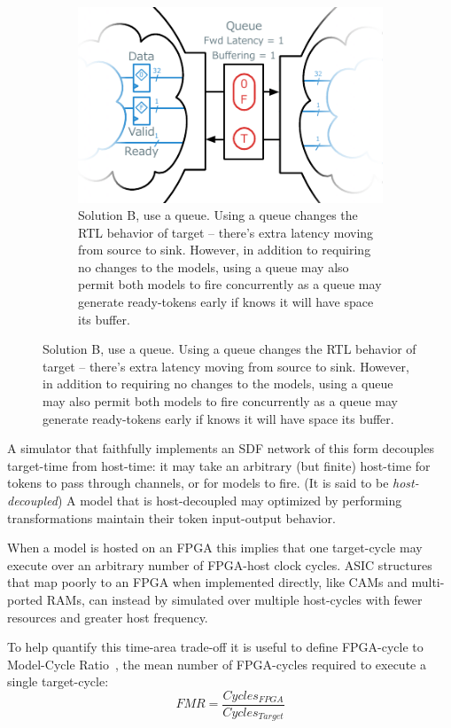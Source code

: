 \begin{figure}
\begin{subfigure}[t]{0.48\textwidth}
    \end{subfigure}\hspace{0.5cm}
    \begin{subfigure}[t]{0.48\textwidth}
        \includegraphics[width=\textwidth]{figures/queue-decoupled-example.pdf}
        \caption{Solution B, use a queue. Using a queue changes the RTL
        behavior of target -- there's extra latency moving from source to sink.
        However, in addition to requiring no changes to the models, using a queue may also
        permit both models to fire concurrently as a queue may generate
        ready-tokens early if knows it will have space its buffer.}
        \label{fig:queue-decoupled-example}
    \end{subfigure}
\end{figure}

A simulator that faithfully implements an SDF network of this form decouples
target-time from host-time: it may take an arbitrary (but finite) host-time for
tokens to pass through channels, or for models to fire. (It is said to be
\emph{host-decoupled}) A model that is host-decoupled may optimized by
performing transformations maintain their token input-output behavior.

When a model is hosted on an FPGA this implies that one target-cycle may
execute over an arbitrary number of FPGA-host clock cycles.  ASIC structures
that map poorly to an FPGA when implemented directly, like CAMs and
multi-ported RAMs, can instead by simulated over multiple host-cycles with
fewer resources and greater host frequency.

To help quantify this time-area trade-off it is useful to define FPGA-cycle to
Model-Cycle Ratio~\cite{APorts}, the mean number of FPGA-cycles required to
execute a single target-cycle: $$ FMR = \frac{Cycles_{FPGA}}{Cycles_{Target}}
$$

